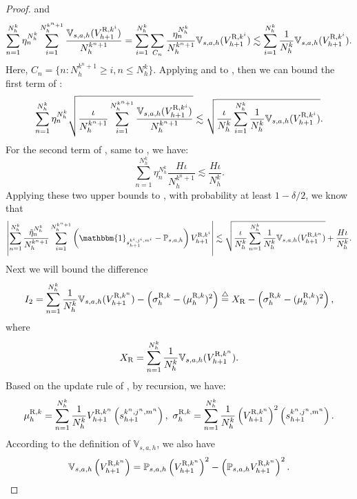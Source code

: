 \documentclass{article}
\newcommand{\R}{\textnormal{R}}
\begin{document}
\begin{proof}
    and
    \begin{equation}
    \label{b22}
        \sum_{n=1}^{N_h^k}\eta_n^{N_h^k}\sum_{i=1}^{N_h^{k^n+1}}\frac{\mathbb{V}_{s,a,h}(V_{h+1}^{\R,k^i})}{N_h^{k^n+1}} = \sum_{i=1}^{N_h^k} \sum_{C_n} \frac{\eta_n^{N_h^k}}{N_h^{k^n+1}}\mathbb{V}_{s,a,h}(V_{h+1}^{\R,k^i}) \lesssim \sum_{i=1}^{N_h^k}\frac{1}{N_h^k}\mathbb{V}_{s,a,h}(V_{h+1}^{\R,k^i}).
    \end{equation}
    Here, $C_n = \{n:N_h^{k^n+1} \geq i, n\leq N_h^k\}$. Applying  and  to , then we can bound the first term of :
    $$\sum_{n=1}^{N_h^k} \eta_n^{N_h^k} \sqrt{\frac{\iota}{N_h^{k^n+1}}\sum_{i=1}^{N_h^{k^n+1}}\frac{\mathbb{V}_{s,a,h}(V_{h+1}^{\R,k^i})}{N_h^{k^n+1}}} \lesssim \sqrt{\frac{\iota}{N_h^k}\sum_{i=1}^{N_h^k}\frac{1}{N_h^k}\mathbb{V}_{s,a,h}(V_{h+1}^{\R,k^i})}.$$
    For the second term of , same to , we have:
    $$\sum_{n=1}^{N_h^k} \eta_n^{N_h^k} \frac{H\iota}{N_h^{k^n+1}} \lesssim \frac{H\iota}{N_h^k}.$$
    Applying these two upper bounds to , with probability at least $1-\delta/2$, we know that
    \begin{align}
    \label{refpossitivefinal}
        \left|\sum_{n=1}^{N_h^k} \frac{\Tilde{\eta}_n^{N_h^k}} {N_h^{k^n+1}}\sum_{i=1}^{N_h^{k^n+1}}\left(\mathbbm{1}_{s_{h+1}^{k^i,j^i,m^i}}-\mathbb{P}_{s,a,h}\right)V_{h+1}^{\R,k^i}\right| 
       \lesssim \sqrt{\frac{\iota}{N_h^k}\sum_{n=1}^{N_h^k}\frac{1}{N_h^k}\mathbb{V}_{s,a,h}(V_{h+1}^{\R,k^n})} + \frac{H\iota}{N_h^k}.
    \end{align}
    Next we will bound the difference $$I_2 = \sum_{n=1}^{N_h^k}\frac{1}{N_h^k}\mathbb{V}_{s,a,h}(V_{h+1}^{\R,k^n}) - \left(\sigma_h^{\R,k}-(\mu_h^{\R,k})^2\right) \overset{\triangle}{=} X_{\R}- \left(\sigma_h^{\R,k}-(\mu_h^{\R,k})^2\right),$$
    where $$X_{\R} = \sum_{n=1}^{N_h^k}\frac{1}{N_h^k}\mathbb{V}_{s,a,h}(V_{h+1}^{\R,k^n}).$$
    Based on the update rule of , by recursion, we have:
    \begin{equation}
    \label{musigmaref}
        \mu_h^{\R,k} = \sum_{n=1}^{N_h^k}\frac{1}{N_h^k}V_{h+1}^{\R,k^n}\left(s_{h+1}^{k^n,j^n,m^n}\right),\ \sigma_h^{\R,k} = \sum_{n=1}^{N_h^k}\frac{1}{N_h^k}\left(V_{h+1}^{\R,k^n}\right)^2\left(s_{h+1}^{k^n,j^n,m^n}\right).
    \end{equation}
    According to the definition of $\mathbb{V}_{s,a,h}$, we also have
    \begin{equation}
        \label{defV2}
        \mathbb{V}_{s,a,h}\left(V_{h+1}^{\R,k^n} \right) = \mathbb{P}_{s,a,h}\left(V_{h+1}^{\R,k^n}\right)^2 - \left(\mathbb{P}_{s,a,h} V_{h+1}^{\R,k^n} \right)^2.

\end{equation}
\end{proof}
\end{document}
